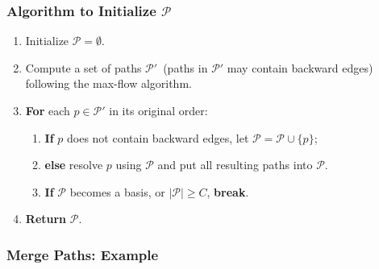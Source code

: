 \frame
{
	\frametitle{Algorithm to Initialize $\mathcal{P}$}

	\begin{enumerate}
	\item Initialize $\mathcal{P} = \emptyset$.
	\vspace{0.2cm}
	\item Compute a set of paths $\mathcal{P}'$~(paths in $\mathcal{P}'$ may contain backward edges) following the max-flow algorithm.
	\vspace{0.2cm}
	\item {\bf For} each $p\in\mathcal{P}'$ in its original order:
		\begin{enumerate}
		\vspace{0.1cm}
		\item {\bf If} $p$ does not contain backward edges, let $\mathcal{P} = \mathcal{P}\cup\{p\}$;
		\vspace{0.1cm}
		\item {\bf else} resolve $p$ using $\mathcal{P}$ and put all resulting paths into $\mathcal{P}$.
		\vspace{0.1cm}
		\item {\bf If} $\mathcal{P}$ becomes a basis, or $|\mathcal{P}| \ge C$, {\bf break}.
		\end{enumerate}
	\vspace{0.2cm}
	\item {\bf Return} $\mathcal{P}$.
	\end{enumerate}
}



\frame
{
	\frametitle{Merge Paths: Example}

	\vspace{0.1cm}
	
	\vspace{3.0cm}

	
}
